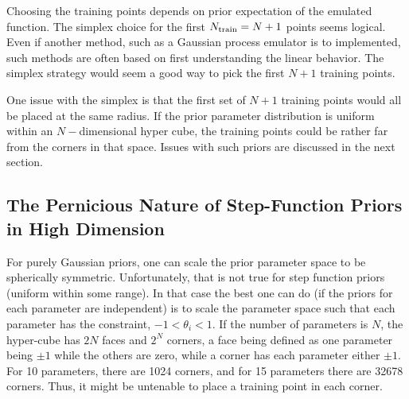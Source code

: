 \documentclass[UserManual.tex]{subfiles}
\begin{document}
Choosing the training points depends on prior expectation of the emulated function. The simplex choice for the first $N_{\rm train}=N+1$ points seems logical. Even if another method, such as a Gaussian process emulator is to implemented, such methods are often based on first understanding the linear behavior. The simplex strategy would seem a good way to pick the first $N+1$ training points.

One issue with the simplex is that the first set of $N+1$ training points would all be placed at the same radius. If the prior parameter distribution is uniform within an $N-$dimensional hyper cube, the training  points could be rather far from the corners in that space. Issues with such priors are discussed in the next section.



\subsection{The Pernicious Nature of Step-Function Priors in High Dimension}

For purely Gaussian priors, one can scale the prior parameter space to be spherically symmetric. Unfortunately, that is not true for step function priors (uniform within some range). In that case the best one can do (if the priors for each parameter are independent) is to scale the parameter space such that each parameter has the constraint, $-1<\theta_i<1$. If the number of parameters is $N$, the hyper-cube has $2N$ faces and $2^N$ corners, a face being defined as one parameter being $\pm 1$ while the others are zero, while a corner has each parameter either $\pm 1$. For 10 parameters, there are 1024 corners, and for 15 parameters there are 32678 corners. Thus, it might be untenable to place a training point in each corner. 
\end{document}
